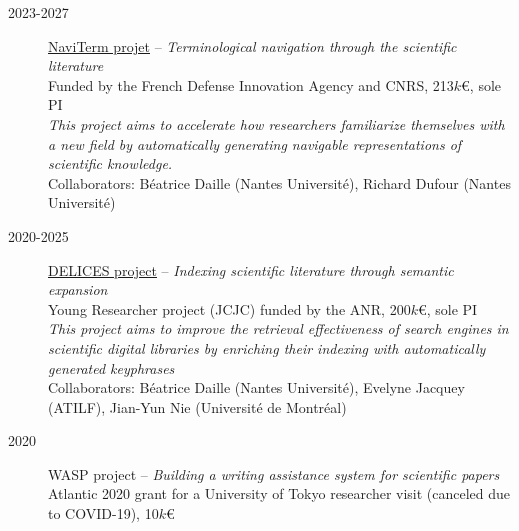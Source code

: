 \begin{description}

    \item[2023-2027] \href{https://cnrs-naviterm.github.io/}{NaviTerm projet} --
                    \emph{Terminological navigation through the scientific literature} \\
                    Funded by the French Defense Innovation Agency and CNRS, 213$k$€, sole PI \\[.1em]
                    \emph{This project aims to accelerate how researchers familiarize themselves with a new field by automatically generating navigable representations of scientific knowledge.}\\[.1em]
                    Collaborators: Béatrice Daille (Nantes Université), Richard Dufour (Nantes Université)

    \item[2020-2025] \href{https://anr-delices.github.io/}{DELICES project} --
                    \emph{Indexing scientific literature through semantic expansion} \\
                    Young Researcher project (JCJC) funded by the ANR, 200$k$€, sole PI \\[.1em]
                    \emph{This project aims to improve the retrieval effectiveness of search engines in scientific digital libraries by enriching their indexing with automatically generated keyphrases}\\[.1em]
                    Collaborators: Béatrice Daille (Nantes Université), Evelyne Jacquey (ATILF), Jian-Yun Nie (Université de Montréal)

    \item[2020] WASP project --
                \emph{Building a writing assistance system for scientific papers} \\
                 Atlantic 2020 grant for a University of Tokyo researcher visit (canceled due to COVID-19), 10$k$€
    

\end{description}
